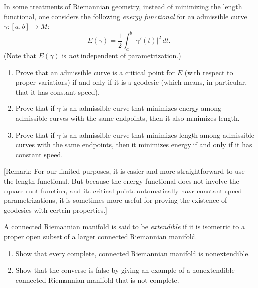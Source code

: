 \begin{exercise}
\label{prob:energy-functional}

In some treatments of Riemannian geometry, instead of minimizing the length functional, one considers the following \emph{energy functional} for an admissible curve $\gamma: [a,b] \to M$:
\[
E(\gamma) = \frac{1}{2} \int_a^b |\gamma'(t)|^2 \, dt.
\]
(Note that $E(\gamma)$ is \emph{not} independent of parametrization.)
\begin{enumerate}
\item[(a)] Prove that an admissible curve is a critical point for $E$ (with respect to proper variations) if and only if it is a geodesic (which means, in particular, that it has constant speed).
\item[(b)] Prove that if $\gamma$ is an admissible curve that minimizes energy among admissible curves with the same endpoints, then it also minimizes length.
\item[(c)] Prove that if $\gamma$ is an admissible curve that minimizes length among admissible curves with the same endpoints, then it minimizes energy if and only if it has constant speed.
\end{enumerate}
[Remark: For our limited purposes, it is easier and more straightforward to use the length functional. But because the energy functional does not involve the square root function, and its critical points automatically have constant-speed parametrizations, it is sometimes more useful for proving the existence of geodesics with certain properties.]
\end{exercise}

\begin{exercise}
\label{prob:extendible}

A connected Riemannian manifold is said to be \emph{extendible} if it is isometric to a proper open subset of a larger connected Riemannian manifold.
\begin{enumerate}
\item[(a)] Show that every complete, connected Riemannian manifold is nonextendible.
\item[(b)] Show that the converse is false by giving an example of a nonextendible connected Riemannian manifold that is not complete.
\end{enumerate}
\end{exercise}

